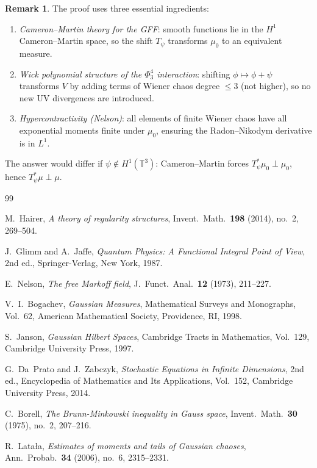 \documentclass[12pt]{article}
\theoremstyle{definition}
\newtheorem{remark}[theorem]{Remark}
\begin{document}
\begin{remark}
The proof uses three essential ingredients:
\begin{enumerate}[(1)]
  \item \emph{Cameron--Martin theory for the GFF}: smooth functions lie in the $H^1$ Cameron--Martin
    space, so the shift $T_\psi$ transforms $\mu_0$ to an equivalent measure.
  \item \emph{Wick polynomial structure of the $\Phi^4_3$ interaction}: shifting $\phi \mapsto
    \phi + \psi$ transforms $V$ by adding terms of Wiener chaos degree $\leq 3$ (not higher), so
    no new UV divergences are introduced.
  \item \emph{Hypercontractivity (Nelson)}: all elements of finite Wiener chaos have all
    exponential moments finite under $\mu_0$, ensuring the Radon--Nikodym derivative is in $L^1$.
\end{enumerate}
The answer would differ if $\psi \notin H^1(\mathbb{T}^3)$: Cameron--Martin forces
$T_\psi^*\mu_0 \perp \mu_0$, hence $T_\psi^*\mu \perp \mu$.
\end{remark}

\begin{thebibliography}{99}

M.~Hairer,
\emph{A theory of regularity structures},
Invent.\ Math.\ \textbf{198} (2014), no.~2, 269--504.

J.~Glimm and A.~Jaffe,
\emph{Quantum Physics: A Functional Integral Point of View},
2nd ed., Springer-Verlag, New York, 1987.

E.~Nelson,
\emph{The free Markoff field},
J.\ Funct.\ Anal.\ \textbf{12} (1973), 211--227.

V.~I.~Bogachev,
\emph{Gaussian Measures},
Mathematical Surveys and Monographs, Vol.~62,
American Mathematical Society, Providence, RI, 1998.

S.~Janson,
\emph{Gaussian Hilbert Spaces},
Cambridge Tracts in Mathematics, Vol.~129,
Cambridge University Press, 1997.

G.~Da~Prato and J.~Zabczyk,
\emph{Stochastic Equations in Infinite Dimensions},
2nd ed., Encyclopedia of Mathematics and Its Applications, Vol.~152,
Cambridge University Press, 2014.

C.~Borell,
\emph{The Brunn-Minkowski inequality in Gauss space},
Invent.\ Math.\ \textbf{30} (1975), no.~2, 207--216.

R.~Lata\l{}a,
\emph{Estimates of moments and tails of Gaussian chaoses},
Ann.\ Probab.\ \textbf{34} (2006), no.~6, 2315--2331.

\end{thebibliography}
\end{document}
